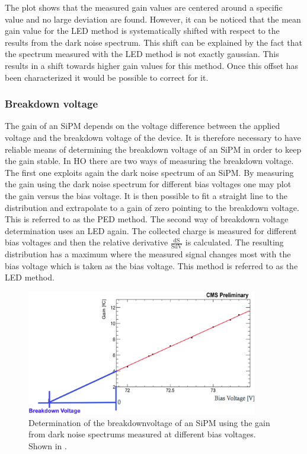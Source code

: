 The plot shows that the measured gain values are centered around a specific value and no large deviation are found. However, it can be noticed that the mean gain value for the LED method is systematically shifted with respect to the results from the dark noise spectrum. This shift can be explained by the fact that the spectrum measured with the LED method is not exactly gaussian. This results in a shift towards higher gain values for this method. Once this offset has been characterized it would be possible to correct for it.

\subsubsection{Breakdown voltage}
The gain of an SiPM depends on the voltage difference between the applied voltage and the breakdown voltage of the device. It is therefore necessary to have reliable means of determining the breakdown voltage of an SiPM in order to keep the gain stable. In HO there are two ways of measuring the breakdown voltage. The first one exploits again the dark noise spectrum of an SiPM. By measuring the gain using the dark noise spectrum for different bias voltages one may plot the gain versus the bias voltage. It is then possible to fit a straight line to the distribution and extrapolate to a gain of zero pointing to the breakdown voltage. This is referred to as the PED method. The second way of breakdown voltage determination uses an LED again. The collected charge is measured for different bias voltages and then the relative derivative $\frac{\text{dS}}{\text{SdV}}$ is calculated. The resulting distribution has a maximum where the measured signal changes most with the bias voltage which is taken as the bias voltage. This method is referred to as the LED method.
\begin{figure}[bh]
\centering
\includegraphics[width=0.9\textwidth]{Figures/kuensken/bvPedDetermination.png}
\caption{Determination of the breakdownvoltage of an SiPM using the gain from dark noise spectrums measured at different bias voltages. Shown in \cite{kuenskenCalor}.}
\label{kuenskenbvPed}
\end{figure}
